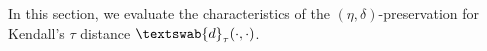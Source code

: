 






In this section, we evaluate the characteristics of the  $(\eta,\delta)$-preservation for Kendall's $\tau$ distance $\textswab{d}_\tau(\cdot, \cdot)$.

